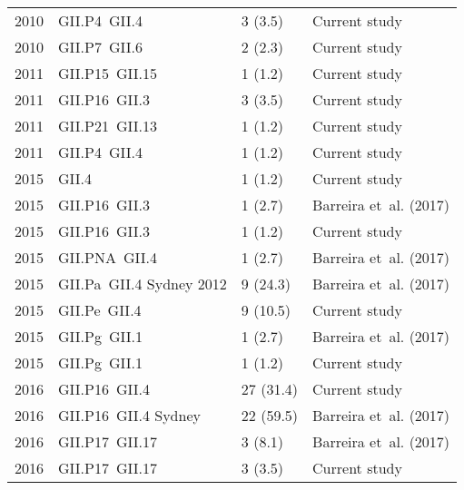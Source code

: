 \begin{table}[htbp]
\begin{tabular}{p{0.6cm}p{3.2cm}p{1.8cm}p{2.5cm}}
        2010       & GII.P4~GII.4                        & 3 (3.5)  & Current study \\
        2010       & GII.P7~GII.6                        & 2 (2.3)  & Current study \\
        2011       & GII.P15~GII.15                      & 1 (1.2)  & Current study \\
        2011       & GII.P16~GII.3                       & 3 (3.5)  & Current study \\
        2011       & GII.P21~GII.13                      & 1 (1.2)  & Current study \\
        2011       & GII.P4~GII.4                        & 1 (1.2)  & Current study \\
        2015       & GII.4                               & 1 (1.2)  & Current study \\
        2015       & GII.P16~GII.3                       & 1 (2.7)  & Barreira et~al. (2017) \\
        2015       & GII.P16~GII.3                       & 1 (1.2)  & Current study \\
        2015       & GII.PNA~GII.4                       & 1 (2.7)  & Barreira et~al. (2017) \\
        2015       & GII.Pa~GII.4 Sydney 2012            & 9 (24.3)  & Barreira et~al. (2017) \\
        2015       & GII.Pe~GII.4                        & 9 (10.5)  & Current study \\
        2015       & GII.Pg~GII.1                        & 1 (2.7)  & Barreira et~al. (2017) \\
        2015       & GII.Pg~GII.1                        & 1 (1.2)  & Current study \\
        2016       & GII.P16~GII.4                       & 27 (31.4)  & Current study \\
        2016       & GII.P16~GII.4 Sydney                & 22 (59.5)  & Barreira et~al. (2017) \\
        2016       & GII.P17~GII.17                      & 3 (8.1)  & Barreira et~al. (2017) \\
        2016       & GII.P17~GII.17                      & 3 (3.5)  & Current study \\
        \bottomrule
    \end{tabular}
    \label{tab:sup_norovirus_strains_extended}
\end{table}